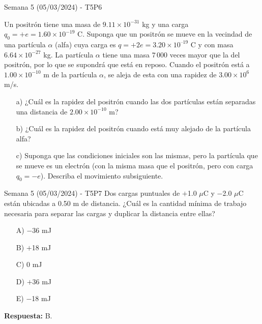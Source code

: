 \begin{frame}{Semana 5 (05/03/2024) - T5P6}

    Un positrón tiene una masa de $9.11\times10^{-31}$ kg y una carga $q_0 = +e = 1.60 \times 10^{-19}$ C. Suponga que un
positrón se mueve en la vecindad de una partícula $\alpha$ (alfa) cuya carga
es $q = +2e = 3.20 \times 10^{–19}$ C y con masa $6.64 \times 10^{-27}$ kg. La partícula $\alpha$
tiene una masa $7\,000$ veces mayor que la del positrón, por lo que se
supondrá que está en reposo. Cuando el positrón está a $1.00 \times 10^{-10}$ m
de la partícula $\alpha$, se aleja de esta con una rapidez de $3.00 \times 10^6$ m/s.

\begin{itemize}
    \item[a)] ¿Cuál es la rapidez del positrón cuando las dos partículas están separadas una distancia de $2.00 \times 10^{-10}$ m?
    \item[b)] ¿Cuál es la rapidez del
positrón cuando está muy alejado de la partícula alfa?
    \item[c)] Suponga
que las condiciones iniciales son las mismas, pero la partícula que se
mueve es un electrón (con la misma masa que el positrón, pero con
carga $q_0 = -e$). Describa el movimiento subsiguiente.
\end{itemize}
    
\end{frame}

\begin{frame}{Semana 5 (05/03/2024) - T5P7}
    Dos cargas puntuales de $+$1.0 $\mu$C y $-$2.0 $\mu$C están ubicadas a 0.50 m de distancia. ¿Cuál es la cantidad mínima de trabajo necesaria para separar las cargas y duplicar la distancia entre ellas?
    
    \begin{itemize}
        \item[A)] $-$36 mJ
        \item[B)] $+$18 mJ
        \item[C)]0 mJ
        \item[D)]$+$36 mJ
        \item[E)]$-$18 mJ
    \end{itemize}
    
    \pause \begin{center}
        \textbf{Respuesta:} B.
    \end{center}
    
\end{frame}

